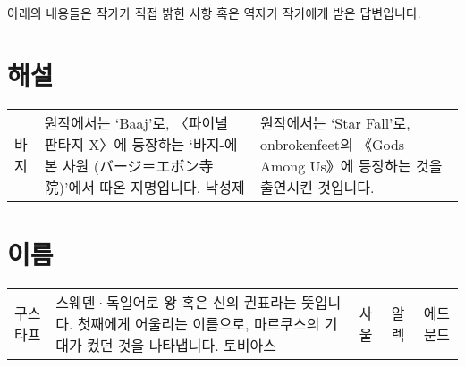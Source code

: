 \textsf{아래의 내용들은 작가가 직접 밝힌 사항 혹은 역자가 작가에게 받은 답변입니다.}

\section*{ 해설}

\begin{tabularx}{\textwidth}{l X}
	\textsf{바지} & 원작에서는 `Baaj'로, 〈파이널 판타지 X〉에 등장하는 `바지-에본 사원 (バージ＝エボン寺院)'에서 따온 지명입니다.
	\textsf{낙성제} & 원작에서는 `Star Fall'로, onbrokenfeet의 《Gods Among Us》에 등장하는 것을 출연시킨 것입니다.
\end{tabularx}

\section*{ 이름}

\begin{tabularx}{\textwidth}{l X}
	\textsf{구스타프} & 스웨덴·독일어로 왕 혹은 신의 권표라는 뜻입니다. 첫째에게 어울리는 이름으로, 마르쿠스의 기대가 컸던 것을 나타냅니다.
	\textsf{토비아스} & 
	\textsf{사울} & 
	\textsf{알렉} & 
	\textsf{에드문드} & 
\end{tabularx}
